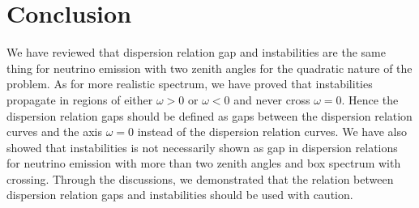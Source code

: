 \section{\label{chap:dr-sec:conclusion}Conclusion}


We have reviewed that dispersion relation gap and instabilities are the same thing for neutrino emission with two zenith angles for the quadratic nature of the problem. As for more realistic spectrum, we have proved that instabilities propagate in regions of either $\omega>0$ or $\omega<0$ and never cross $\omega=0$. Hence the dispersion relation gaps should be defined as gaps between the dispersion relation curves and the axis $\omega=0$ instead of the dispersion relation curves. We have also showed that instabilities is not necessarily shown as gap in dispersion relations for neutrino emission with more than two zenith angles and box spectrum with crossing. Through the discussions, we demonstrated that the relation between dispersion relation gaps and instabilities should be used with caution.
